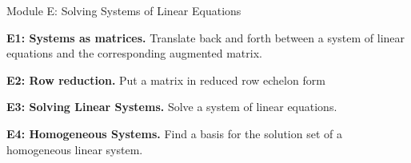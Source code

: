 
\begin{module}{Module E: Solving Systems of Linear Equations}

\begin{moduleStandards}
  \item \textbf{E1: Systems as matrices.}
        Translate back and forth between a system of linear equations and
        the corresponding augmented matrix.
  \item \textbf{E2: Row reduction.}
        Put a matrix in reduced row echelon form
  \item \textbf{E3: Solving Linear Systems.}
        Solve a system of linear equations.
  \item \textbf{E4: Homogeneous Systems.}
        Find a basis for the solution set of a homogeneous linear system.
\end{moduleStandards}







\end{module}
